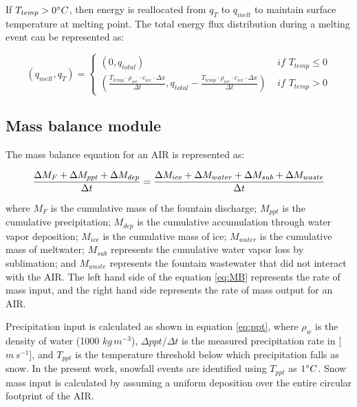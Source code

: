 If $T_{temp} > 0 ^{\circ} C$, then energy is reallocated from $q_{T}$ to $q_{melt}$ to maintain surface
temperature at melting point. The total energy flux distribution during a melting event can be represented as:

\begin{equation}
	(q_{melt}, q_{T}) = \left\{ \begin{array}{ll}
		(0, q_{total})
		                                                                                                                                                               & \textit{ if } T_{temp} \leq 0 \\
		(\frac{T_{temp} \cdot \rho_{ice} \cdot c_{ice} \cdot \Delta x}{\Delta t}, q_{total}-\frac{T_{temp} \cdot \rho_{ice} \cdot c_{ice} \cdot \Delta x}{\Delta t}  ) & \textit{ if } T_{temp} > 0
	\end{array} \right.
\end{equation}

\subsection{Mass balance module}

The mass balance equation for an \ac{AIR} is represented as:

\begin{equation}
	\frac{\Delta M_{F} + \Delta M_{ppt} + \Delta M_{dep}}{\Delta t} = \frac{\Delta M_{ice} +\Delta M_{water} +
		\Delta M_{sub} + \Delta M_{waste}}{\Delta t}  \\
	\label{eq:MB}
\end{equation}

where $M_{F}$ is the cumulative mass of the fountain discharge; $M_{ppt}$ is the cumulative precipitation; $M_{dep}$ is the cumulative
accumulation through water vapor deposition; $M_{ice}$ is the cumulative mass of ice; $M_{water}$ is the cumulative
mass of meltwater; $M_{sub}$ represents the cumulative water vapor loss by sublimation; and $M_{waste}$ represents the
fountain wastewater that did not interact with the \ac{AIR}. The left hand side of the equation \ref{eq:MB} represents the rate of
mass input, and the right hand side represents the rate of mass output for an \ac{AIR}.

Precipitation input is calculated as shown in equation \ref{eq:ppt}, where $\rho_{w}$ is the density of water (1000
$kg\,m^{-3}$), $\Delta ppt/ \Delta t$ is the measured precipitation rate in [$m\,s^{-1}$], and $T_{ppt}$ is the temperature threshold
below which precipitation falls as snow. In the present work, snowfall events are identified using $T_{ppt}$ as $1 ^{\circ} C$. Snow
mass input is calculated by assuming a uniform deposition over the entire circular footprint of the \ac{AIR}.


